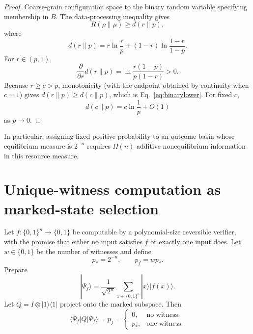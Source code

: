 \documentclass[pdflatex,sn-mathphys-num]{sn-jnl}
\theoremstyle{thmstyleone}
\begin{document}
\begin{proof}
Coarse-grain configuration space to the binary random variable specifying membership in $B$. The data-processing inequality gives
\begin{equation}
R(\rho\|\mu)\ge d(r\|p),
\end{equation}
where
\begin{equation}
d(r\|p)=r\ln\frac{r}{p}+(1-r)\ln\frac{1-r}{1-p}.
\end{equation}
For $r\in(p,1)$,
\begin{equation}
\frac{\partial}{\partial r}d(r\|p)
=\ln\frac{r(1-p)}{p(1-r)}>0.
\end{equation}
Because $r\ge c>p$, monotonicity (with the endpoint obtained by continuity when $c=1$) gives $d(r\|p)\ge d(c\|p)$, which is Eq.~\eqref{eq:binarylower}. For fixed $c$,
\begin{equation}
d(c\|p)=c\ln\frac1p+O(1)
\end{equation}
as $p\rightarrow0$.
\end{proof}

In particular, assigning fixed positive probability to an outcome basin whose equilibrium measure is $2^{-n}$ requires $\Omega(n)$ additive nonequilibrium information in this resource measure.

\section{Unique-witness computation as marked-state selection}

Let $f:\{0,1\}^n\to\{0,1\}$ be computable by a polynomial-size reversible verifier, with the promise that either no input satisfies $f$ or exactly one input does. Let $w\in\{0,1\}$ be the number of witnesses and define
\begin{equation}
p_*=2^{-n},
\qquad
p_f=w p_*.
\label{eq:designactual}
\end{equation}
Prepare
\begin{equation}
|\Psi_f\rangle
=\frac{1}{\sqrt{2^n}}\sum_{x\in\{0,1\}^n}|x\rangle|f(x)\rangle.
\label{eq:verifierstate}
\end{equation}
Let $Q=I\otimes|1\rangle\langle1|$ project onto the marked subspace. Then
\begin{equation}
\langle\Psi_f|Q|\Psi_f\rangle=p_f
=\begin{cases}
0,&\text{no witness},\\[3pt]
p_*,&\text{one witness}.
\end{cases}
\label{eq:pweight}
\end{equation}
\end{document}
